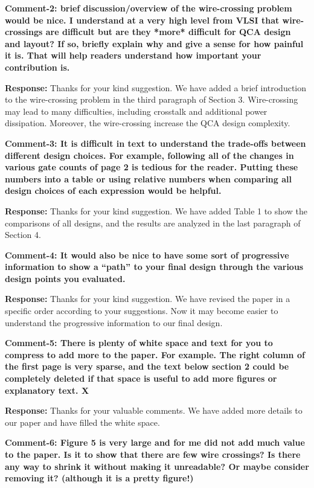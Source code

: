 \documentclass[9pt,journal,compsoc]{IEEEtran}
\begin{document}
\begin{appendices}
{\bfseries Comment-2: brief discussion/overview of the wire-crossing problem would be nice. I understand at a very high level from VLSI that wire-crossings are difficult but are they *more* difficult for QCA design and layout? If so, briefly explain why and give a sense for how painful it is. That will help readers understand how important your contribution is. }

{\bfseries Response: } Thanks for your kind suggestion. We have added a brief introduction to the wire-crossing problem in the third paragraph of Section 3. Wire-crossing may lead to many difficulties, including crosstalk and additional power dissipation. Moreover, the wire-crossing increase the QCA design complexity. 

{\bfseries Comment-3: It is difficult in text to understand the trade-offs between different design choices. For example, following all of the changes in various gate counts of page 2 is tedious for the reader. Putting these numbers into a table or using relative numbers when comparing all design choices of each expression would be helpful. }

{\bfseries Response:} Thanks for your kind suggestion. We have added Table 1 to show the comparisons of all designs, and the results are analyzed in the last paragraph of Section 4.

{\bfseries Comment-4: It would also be nice to have some sort of progressive information to show a “path” to your final design through the various design points you evaluated.}

{\bfseries Response:} Thanks for your kind suggestion. We have revised the paper in a specific order according to your suggestions. Now it may become easier to understand the progressive information to our final design.

{\bfseries Comment-5: There is plenty of white space and text for you to compress to add more to the paper. For example. The right column of the first page is very sparse, and the text below section 2 could be completely deleted if that space is useful to add more figures or explanatory text. X }

{\bfseries Response:} Thanks for your valuable comments. We have added more details to our paper and have filled the white space.

{\bfseries Comment-6: Figure 5 is very large and for me did not add much value to the paper. Is it to show that there are few wire crossings? Is there any way to shrink it without making it unreadable? Or maybe consider removing it? (although it is a pretty figure!) }


\end{appendices}
\end{document}
